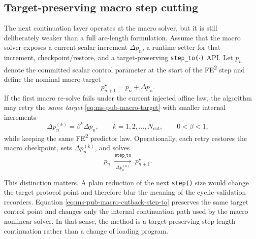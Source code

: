 \subsection{Target-preserving macro step cutting}
\label{sec:ms-pub-macro-step-cutting}

The next continuation layer operates at the macro solver, but it is still
deliberately weaker than a full arc-length formulation.  Assume that the
macro solver exposes a current scalar increment \(\Delta p_n\), a runtime
setter for that increment, checkpoint/restore, and a target-preserving
\texttt{step\_to(\(\cdot\))} API.  Let \(p_n\) denote the committed scalar
control parameter at the start of the FE\textsuperscript{2} step and define
the nominal macro target
\begin{equation}
  p_{n+1}^{\star} = p_n + \Delta p_n.
  \label{eq:ms-pub-macro-target}
\end{equation}
If the first macro re-solve fails under the current injected affine law, the
algorithm may retry the \emph{same target}
\eqref{eq:ms-pub-macro-target} with smaller internal increments
\begin{equation}
  \Delta p_n^{(k)} = \beta^k \Delta p_n,
  \qquad
  k = 1,2,\dots,N_{\mathrm{cut}},
  \qquad
  0 < \beta < 1,
  \label{eq:ms-pub-macro-cutback-increments}
\end{equation}
while keeping the same FE\textsuperscript{2} predictor law.
Operationally, each retry restores the macro checkpoint, sets
\(\Delta p_n^{(k)}\), and solves
\begin{equation}
  p_n \;\xrightarrow[\Delta p_n^{(k)}]{\texttt{step\_to}}\; p_{n+1}^{\star}.
  \label{eq:ms-pub-macro-cutback-step-to}
\end{equation}

This distinction matters.  A plain reduction of the next
\texttt{step()} size would change the target protocol point and therefore blur
the meaning of the cyclic-validation recorders.  Equation
\eqref{eq:ms-pub-macro-cutback-step-to} preserves the same target control
point and changes only the internal continuation path used by the macro
nonlinear solver.  In that sense, the method is a target-preserving
step-length continuation rather than a change of loading program.

